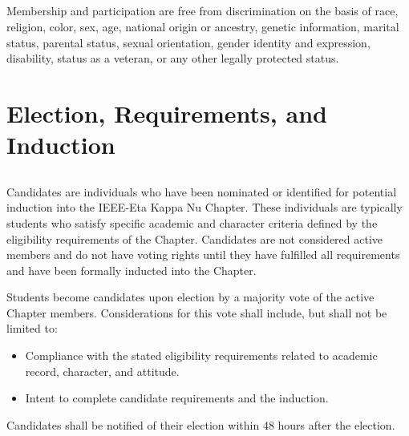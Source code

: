 \documentclass[10pt, oneside]{article}
\begin{document}
\subsection{}
Membership and participation are free from discrimination on the basis of race, religion, color, sex, age, national origin or ancestry, genetic information, marital status, parental status, sexual orientation, gender identity and expression, disability, status as a veteran, or any other legally protected status.

\section{Election, Requirements, and Induction}
\subsection{}
Candidates are individuals who have been nominated or identified for potential induction into the IEEE-Eta Kappa Nu Chapter. These individuals are typically students who satisfy specific academic and character criteria defined by the eligibility requirements of the Chapter. Candidates are not considered active members and do not have voting rights until they have fulfilled all requirements and have been formally inducted into the Chapter.

Students become candidates upon election by a majority vote of the active Chapter members. Considerations for this vote shall include, but shall not be limited to:

\begin{itemize}
    \item Compliance with the stated eligibility requirements related to academic record, character, and attitude.
    \item Intent to complete candidate requirements and the induction.
\end{itemize}

Candidates shall be notified of their election within 48 hours after the election.

\end{document}
